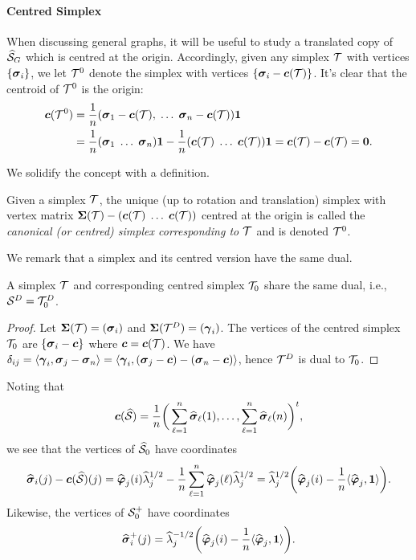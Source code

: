\paragraph{Centred  Simplex}


When discussing general graphs, it will be useful to study a  translated copy of $\widehat{\mathcal{S}}_G$ which is centred at the origin. Accordingly, given any simplex $\mathcal{T}$ with vertices $\{\vb*{\sigma}_i\}$, we let $\mathcal{T}^0$ denote the simplex with vertices $\{\vb*{\sigma}_i - \vb*{c}(\mathcal{T})\}$. It's clear that the centroid of $\mathcal{T}^0$ is the origin: 
\begin{align*}
\vb*{c}(\mathcal{T}^0) 
&= \frac{1}{n}(\vb*{\sigma}_1-\vb*{c}(\mathcal{T}),\;\dots\;\vb*{\sigma}_n-\vb*{c}(\mathcal{T}))\vb{1} \\
&= \frac{1}{n}(\vb*{\sigma}_1\;\dots\;\vb*{\sigma}_n)\vb{1} - \frac{1}{n}(\vb*{c}(\mathcal{T})\;\dots\;\vb*{c}(\mathcal{T}))\vb{1} = \vb*{c}(\mathcal{T}) - \vb*{c}(\mathcal{T})=\vb{0}.
\end{align*}

We solidify the concept with a definition. 

\begin{definition}
	Given a simplex $\mathcal{T}$, the unique (up to rotation and translation) simplex with vertex matrix $\boldsymbol{\Sigma}(\mathcal{T}) - (\vb*{c}(\mathcal{T})\;\dots\;\vb*{c}(\mathcal{T}))$ centred at the origin is called the \emph{canonical (or centred) simplex corresponding to $\mathcal{T}$} and is denoted $\mathcal{T}^0$. 
\end{definition}

We remark that a simplex and its centred version have the same dual. 

\begin{observation}
	\label{obs:dual_centred}
	A simplex $\mathcal{T}$ and corresponding centred simplex $\mathcal{T}_0$ share the same dual, i.e., $\mathcal{S}^D = \mathcal{T}_0^D$. 
\end{observation}
\begin{proof}
	Let $\boldsymbol{\Sigma}(\mathcal{T}) = (\vb*{\sigma}_i)$ and $\boldsymbol{\Sigma}(\mathcal{T}^D) = (\vb*{\gamma}_i)$. The vertices of the centred simplex $\mathcal{T}_0$ are $\{\vb*{\sigma}_i - \vb*{c}\}$ where $\vb*{c}=\vb*{c}(\mathcal{T})$. We have 
	$\delta_{ij} = \langle \vb*{\gamma}_i,\vb*{\sigma}_j-\vb*{\sigma}_n \rangle = \langle \vb*{\gamma}_i, (\vb*{\sigma}_j-\vb*{c}) - (\vb*{\sigma}_n-\vb*{c})\rangle$, 
	hence $\mathcal{T}^D$ is dual to $\mathcal{T}_0$. 
\end{proof}

Noting that 
\begin{equation*}
\vb*{c}(\widehat{\mathcal{S}}) = \frac{1}{n}\bigg(\sum_{\ell=1}^n \widehat{\vb*{\sigma}}_\ell(1),\dots,\sum_{\ell=1}^n \widehat{\vb*{\sigma}}_\ell(n)\bigg)^t,
\end{equation*}
we see that the vertices of $\widehat{\mathcal{S}}_0$ have coordinates
\begin{equation*}
\widehat{\vb*{\sigma}}_i(j) - \vb*{c}(\widehat{\mathcal{S}})(j) = \widehat{\vb*{\varphi}}_j(i)\widehat{\lambda}_j^{1/2} - \frac{1}{n}\sum_{\ell=1}^n \widehat{\vb*{\varphi}}_j(\ell)\widehat{\lambda}_j^{1/2} = \widehat{\lambda}_j^{1/2} \bigg(\widehat{\vb*{\varphi}}_j(i) - \frac{1}{n}\langle \widehat{\vb*{\varphi}}_j,\vb{1}\rangle \bigg).
\end{equation*}
Likewise, the vertices of $\mathcal{S}_0^+$ have coordinates 
\begin{equation*}
\widehat{\vb*{\sigma}}_i^+(j) = \widehat{\lambda}_j^{-1/2}\bigg(\widehat{\vb*{\varphi}}_j(i) - \frac{1}{n}\langle \widehat{\vb*{\varphi}}_j,\vb{1}\rangle\bigg).
\end{equation*}


